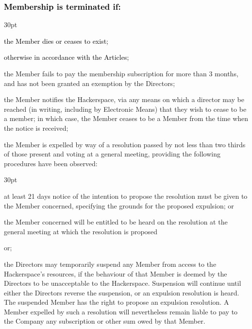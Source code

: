 \documentclass[12pt]{article}
\def\clauseindent{30pt}
\def\fakecolour{black}
\newenvironment{subindentpara}{\raggedright\begin{adjustwidth}{\clauseindent}{}\begin{hanginglist}}{\end{hanginglist}\end{adjustwidth}}
\begin{document}
\subsubsection[Specifics of Termination of Membership]{\textcolor{\fakecolour}{Membership is terminated if:}}
\begin{subindentpara}
    \item \textcolor{\fakecolour}{the Member dies or ceases to exist;}
    \item \textcolor{\fakecolour}{otherwise in accordance with the Articles;}
    \item the Member fails to pay the membership subscription for more than 3 months, and has not been granted an exemption by the Directors;
    \item the Member notifies the Hackerspace, via any means on which a director may be reached (in writing, including by Electronic Means) that they wish to cease to be a member; in which case, the Member ceases to be a Member from the time when the notice is received;
    \item the Member is expelled by way of a resolution passed by not less than two thirds of those present and voting at a general meeting, providing the following procedures have been observed: 
    \begin{subindentpara} %
        \item at least 21 days notice of the intention to propose the resolution must be given to the Member concerned,  specifying the grounds for the proposed expulsion; or
        \item the Member concerned will be entitled to be heard on the resolution at the general meeting at which the resolution is proposed
    \end{subindentpara}
    \item or;
    \item the Directors may temporarily suspend any Member from access to the Hackerspace's resources, if the behaviour of that Member is deemed by the Directors to be unacceptable to the Hackerspace. Suspension will continue until either the Directors reverse the suspension, or an expulsion resolution is heard. The suspended Member has the right to propose an expulsion resolution. A Member expelled by such a resolution will nevertheless remain liable to pay to the Company any subscription or other sum owed by that Member.
\end{subindentpara}
\end{document}
